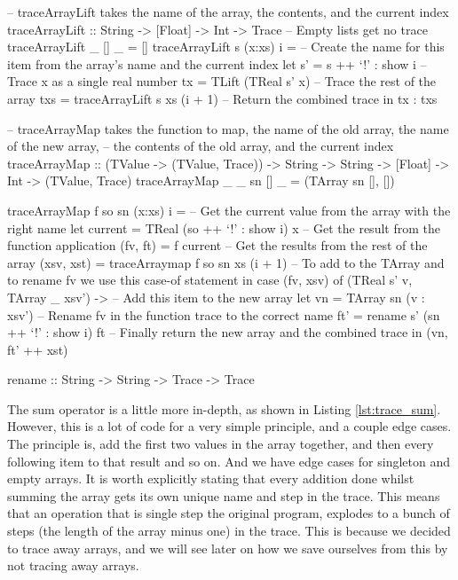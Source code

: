         \begin{haskell}[caption=Tracing array instantiation and array mapping, label=lst:trace_map, gobble=12]
            -- traceArrayLift takes the name of the array, the contents, and the current index
            traceArrayLift :: String -> [Float] -> Int -> Trace
            -- Empty lists get no trace
            traceArrayLift _ []     _ = []
            traceArrayLift s (x:xs) i = 
                -- Create the name for this item from the array's name and the current index
                let s' = s ++ `!' : show i
                -- Trace x as a single real number
                    tx = TLift (TReal s' x)
                -- Trace the rest of the array
                    txs = traceArrayLift s xs (i + 1)
                -- Return the combined trace
                in  tx : txs

            -- traceArrayMap takes the function to map, the name of the old array, the name of the new array, 
            -- the contents of the old array, and the current index
            traceArrayMap :: (TValue -> (TValue, Trace)) -> String -> String -> [Float]
                -> Int -> (TValue, Trace)
            traceArrayMap _ _  sn []     _ = (TArray sn [], [])
            
            traceArrayMap f so sn (x:xs) i =
                -- Get the current value from the array with the right name
                let current  = TReal (so ++ `!' : show i) x
                -- Get the result from the function application
                    (fv, ft) = f current
                -- Get the results from the rest of the array
                    (xsv, xst) = traceArraymap f so sn xs (i + 1)
                -- To add to the TArray and to rename fv we use this case-of statement
                in  case (fv, xsv) of
                    (TReal s' v, TArray _ xsv') ->
                        -- Add this item to the new array
                        let vn = TArray sn (v : xsv')
                        -- Rename fv in the function trace to the correct name
                            ft' = rename s' (sn ++ `!' : show i) ft
                        -- Finally return the new array and the combined trace
                        in  (vn, ft' ++ xst)

            rename :: String -> String -> Trace -> Trace
        \end{haskell}

        The sum operator is a little more in-depth, as shown in Listing \ref{lst:trace_sum}.
        However, this is a lot of code for a very simple principle, and a couple edge cases.
        The principle is, add the first two values in the array together, and then every following item to that result and so on.
        And we have edge cases for singleton and empty arrays.
        It is worth explicitly stating that every addition done whilst summing the array gets its own unique name and step in the trace.
        This means that an operation that is single step the original program, explodes to a bunch of steps (the length of the array minus one) in the trace.
        This is because we decided to trace away arrays, and we will see later on how we save ourselves from this by not tracing away arrays.

